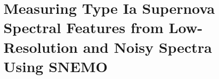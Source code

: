 \chapter{Measuring Type Ia Supernova Spectral Features from Low-Resolution and Noisy Spectra Using SNEMO}

\section{}